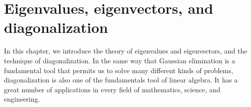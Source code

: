 \chapter{Eigenvalues, eigenvectors, and diagonalization}
\label{cha:eigenvalues}

In this chapter, we introduce the theory of eigenvalues and
eigenvectors, and the technique of diagonalization. In the same way
that Gaussian elimination is a fundamental tool that permits us to
solve many different kinds of problems, diagonalization is also one of
the fundamentals tool of linear algebra. It has a great number of
applications in every field of mathematics, science, and engineering.
